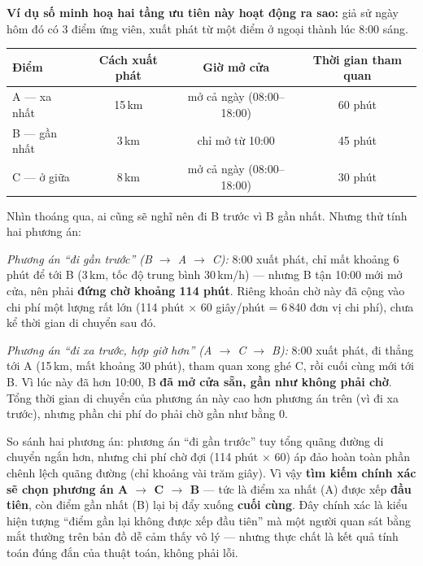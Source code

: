\documentclass[12pt,a4paper]{article}
\begin{document}
\textbf{Ví dụ số minh hoạ hai tầng ưu tiên này hoạt động ra sao:} giả sử ngày
hôm đó có 3 điểm ứng viên, xuất phát từ một điểm ở ngoại thành lúc 8:00 sáng.

\begin{center}
\renewcommand{\arraystretch}{1.15}
\begin{tabular}{|l|c|c|c|}
\hline
\textbf{Điểm} & \textbf{Cách xuất phát} & \textbf{Giờ mở cửa} & \textbf{Thời gian tham quan} \\ \hline
A --- xa nhất & 15\,km & mở cả ngày (08:00--18:00) & 60 phút \\ \hline
B --- gần nhất & 3\,km & chỉ mở từ 10:00 & 45 phút \\ \hline
C --- ở giữa & 8\,km & mở cả ngày (08:00--18:00) & 30 phút \\ \hline
\end{tabular}
\end{center}

Nhìn thoáng qua, ai cũng sẽ nghĩ nên đi B trước vì B gần nhất. Nhưng thử tính
hai phương án:

\textit{Phương án ``đi gần trước'' (B $\to$ A $\to$ C):} 8:00 xuất phát, chỉ mất
khoảng 6 phút để tới B (3\,km, tốc độ trung bình 30\,km/h) --- nhưng B tận
10:00 mới mở cửa, nên phải \textbf{đứng chờ khoảng 114 phút}. Riêng khoản chờ
này đã cộng vào chi phí một lượng rất lớn (114 phút $\times$ 60 giây/phút = 6\,840
đơn vị chi phí), chưa kể thời gian di chuyển sau đó.

\textit{Phương án ``đi xa trước, hợp giờ hơn'' (A $\to$ C $\to$ B):} 8:00 xuất
phát, đi thẳng tới A (15\,km, mất khoảng 30 phút), tham quan xong ghé C, rồi
cuối cùng mới tới B. Vì lúc này đã hơn 10:00, B \textbf{đã mở cửa sẵn, gần như
không phải chờ}. Tổng thời gian di chuyển của phương án này cao hơn phương án
trên (vì đi xa trước), nhưng phần chi phí do phải chờ gần như bằng 0.

So sánh hai phương án: phương án ``đi gần trước'' tuy tổng quãng đường di
chuyển ngắn hơn, nhưng chi phí chờ đợi (114 phút $\times$ 60) áp đảo hoàn toàn
phần chênh lệch quãng đường (chỉ khoảng vài trăm giây). Vì vậy \textbf{tìm kiếm
chính xác sẽ chọn phương án A $\to$ C $\to$ B} --- tức là điểm xa nhất (A) được
xếp \textbf{đầu tiên}, còn điểm gần nhất (B) lại bị đẩy xuống \textbf{cuối
cùng}. Đây chính xác là kiểu hiện tượng ``điểm gần lại không được xếp đầu tiên''
mà một người quan sát bằng mắt thường trên bản đồ dễ cảm thấy vô lý --- nhưng
thực chất là kết quả tính toán đúng đắn của thuật toán, không phải lỗi.
\end{document}
